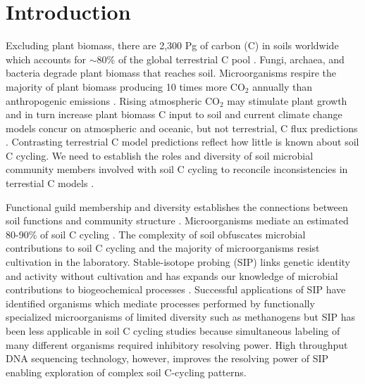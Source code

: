 \section{Introduction}
Excluding plant biomass, there are 2,300 Pg of carbon (C) in soils
worldwide which accounts for $\sim$80\% of the global terrestrial C pool
\citep{Amundson_2001,BATJES_1996}. Fungi, archaea, and bacteria degrade plant
biomass that reaches soil. Microorganisms respire the majority of plant biomass
producing 10 times more CO$_{2}$ annually than anthropogenic emissions
\citep{chapin2002principles}. Rising atmospheric CO$_{2}$ may stimulate
plant growth and in turn increase plant biomass C input to soil
\citep{Groenigen_2006} and current climate change models concur on atmospheric
and oceanic, but not terrestrial, C flux predictions
\citep{Friedlingstein_2006}. Contrasting terrestrial C model predictions
reflect how little is known about soil C cycling. We need to establish the
roles and diversity of soil microbial community members involved with soil
C cycling to reconcile inconsistencies in terrestial C models
\citep{Neff_2001,McGuire2010a}.

Functional guild membership and diversity establishes the connections between
soil functions and community structure \citep{O_Donnell_2002}. Microorganisms
mediate an estimated 80-90\% of soil C cycling
\citep{ColemanCrossley_1996,Nannipieri_2003}. The complexity of soil obfuscates
microbial contributions to soil C cycling and the majority of microorganisms
resist cultivation in the laboratory. Stable-isotope probing (SIP) links
genetic identity and activity without cultivation and has expands our knowledge
of microbial contributions to biogeochemical processes
\citep{Chen_Murrell_2010}. Successful applications of SIP have identified
organisms which mediate processes performed by functionally specialized
microorganisms of limited diversity such as methanogens \citep{Lu_2005} but SIP
has been less applicable in soil C cycling studies because simultaneous
labeling of many different organisms required inhibitory resolving power. High
throughput DNA sequencing technology, however, improves the resolving power of
SIP enabling exploration of complex soil C-cycling patterns.

